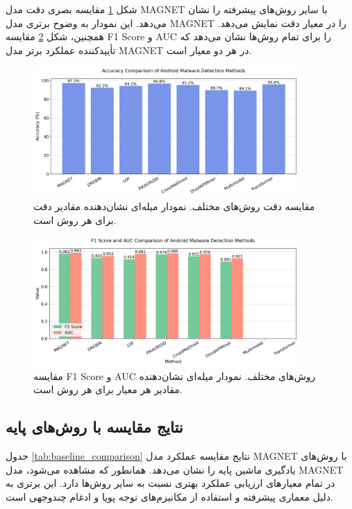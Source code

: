 شکل \ref{fig:literature_comparison_accuracy} مقایسه بصری دقت مدل MAGNET با سایر روش‌های پیشرفته را نشان می‌دهد. این نمودار به وضوح برتری مدل MAGNET را در معیار دقت نمایش می‌دهد. همچنین، شکل \ref{fig:literature_comparison_metrics} مقایسه F1 Score و AUC را برای تمام روش‌ها نشان می‌دهد که تأییدکننده عملکرد برتر مدل MAGNET در هر دو معیار است.

\begin{figure}[h!]
    \centering
    \includegraphics[width=0.9\textwidth]{images/fig_literature_comparison_accuracy}
    \caption{مقایسه دقت روش‌های مختلف. نمودار میله‌ای نشان‌دهنده مقادیر دقت برای هر روش است.}
    \label{fig:literature_comparison_accuracy}
\end{figure}

\begin{figure}[h!]
    \centering
    \includegraphics[width=0.9\textwidth]{images/fig_literature_comparison_metrics}
    \caption{مقایسه F1 Score و AUC روش‌های مختلف. نمودار میله‌ای نشان‌دهنده مقادیر هر معیار برای هر روش است.}
    \label{fig:literature_comparison_metrics}
\end{figure}

\subsection{نتایج مقایسه با روش‌های پایه}
جدول \ref{tab:baseline_comparison} نتایج مقایسه عملکرد مدل MAGNET با روش‌های یادگیری ماشین پایه را نشان می‌دهد. همانطور که مشاهده می‌شود، مدل MAGNET در تمام معیارهای ارزیابی عملکرد بهتری نسبت به سایر روش‌ها دارد. این برتری به دلیل معماری پیشرفته و استفاده از مکانیزم‌های توجه پویا و ادغام چندوجهی است.


